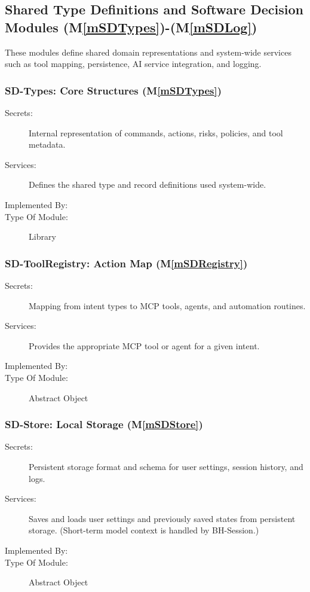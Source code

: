 \documentclass[12pt, titlepage]{article}
\newcommand{\mref}[1]{M\ref{#1}}
\begin{document}
\subsection{Shared Type Definitions and Software Decision Modules (\mref{mSDTypes})-(\mref{mSDLog})}

These modules define shared domain representations and system-wide services such
as tool mapping, persistence, AI service integration, and logging.

\subsubsection{SD-Types: Core Structures (\mref{mSDTypes})}
\begin{description}
\item[Secrets:] Internal representation of commands, actions, risks, policies,
and tool metadata.
\item[Services:] Defines the shared type and record definitions used system-wide.
\item[Implemented By:] \progname{}
\item[Type Of Module:] Library
\end{description}

\subsubsection{SD-ToolRegistry: Action Map (\mref{mSDRegistry})}
\begin{description}
\item[Secrets:] Mapping from intent types to MCP tools, agents, and automation
routines.
\item[Services:] Provides the appropriate MCP tool or agent for a given intent.
\item[Implemented By:] \progname{}
\item[Type Of Module:] Abstract Object
\end{description}

\subsubsection{SD-Store: Local Storage (\mref{mSDStore})}
\begin{description}
\item[Secrets:] Persistent storage format and schema for user settings, session
history, and logs.
\item[Services:] Saves and loads user settings and previously saved states from
persistent storage. (Short-term model context is handled by BH-Session.)
\item[Implemented By:] \progname{}
\item[Type Of Module:] Abstract Object
\end{description}
\end{document}
